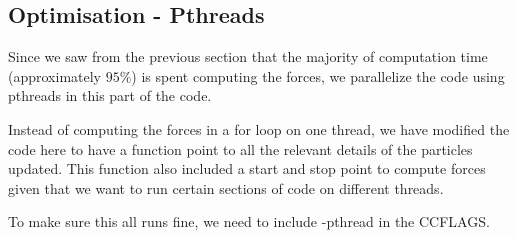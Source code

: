 \subsection{Optimisation - Pthreads}
Since we saw from the previous section that the majority of computation time (approximately $95\%$) is spent computing the forces, we parallelize the code using pthreads in this part of the code.

Instead of computing the forces in a for loop on one thread, we have modified the code here to have a function point to all the relevant details of the particles updated. This function also included a start and stop point to compute forces given that we want to run certain sections of code on different threads.

To make sure this all runs fine, we need to include -pthread in the CCFLAGS.

